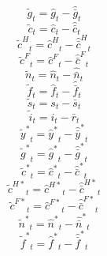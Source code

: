 \begin{dmath}
{{\tilde g}}_{t}={{\hat g}}_{t}-{{\hat {\bar g}}}_{t}
\end{dmath}
\begin{dmath}
{{\tilde c}}_{t}={{\hat c}}_{t}-{{\hat {\bar c}}}_{t}
\end{dmath}
\begin{dmath}
{{\tilde c^H}}_{t}={{\hat c^H}}_{t}-{{\hat {\bar c}^H}}_{t}
\end{dmath}
\begin{dmath}
{{\tilde c^F}}_{t}={{\hat c^F}}_{t}-{{\hat {\bar c}^F}}_{t}
\end{dmath}
\begin{dmath}
{{\tilde n}}_{t}={{\hat n}}_{t}-{{\hat {\bar n}}}_{t}
\end{dmath}
\begin{dmath}
{{\tilde f}}_{t}={{\hat f}}_{t}-{{\hat {\bar f}}}_{t}
\end{dmath}
\begin{dmath}
{{\tilde s}}_{t}={{s}}_{t}-{{\bar s}}_{t}
\end{dmath}
\begin{dmath}
{{\tilde i}}_{t}={{i}}_{t}-{{\bar r}}_{t}
\end{dmath}
\begin{dmath}
{{\tilde y^*}}_{t}={{\hat y^*}}_{t}-{{\hat {\bar y}^*}}_{t}
\end{dmath}
\begin{dmath}
{{\tilde g^*}}_{t}={{\hat g^*}}_{t}-{{\hat {\bar g}^*}}_{t}
\end{dmath}
\begin{dmath}
{{\tilde c^*}}_{t}={{\hat c^*}}_{t}-{{\hat {\bar c}^*}}_{t}
\end{dmath}
\begin{dmath}
{{\tilde c^{H*}}}_{t}={{\hat c^{H*}}}_{t}-{{\hat {\bar c}^{H*}}}_{t}
\end{dmath}
\begin{dmath}
{{\tilde c^{F*}}}_{t}={{\hat c^{F*}}}_{t}-{{\hat {\bar c}^{F*}}}_{t}
\end{dmath}
\begin{dmath}
{{\tilde n^*}}_{t}={{\hat n^*}}_{t}-{{\hat {\bar n}^*}}_{t}
\end{dmath}
\begin{dmath}
{{\tilde f^*}}_{t}={{\hat f^*}}_{t}-{{\hat {\bar f}^*}}_{t}
\end{dmath}
